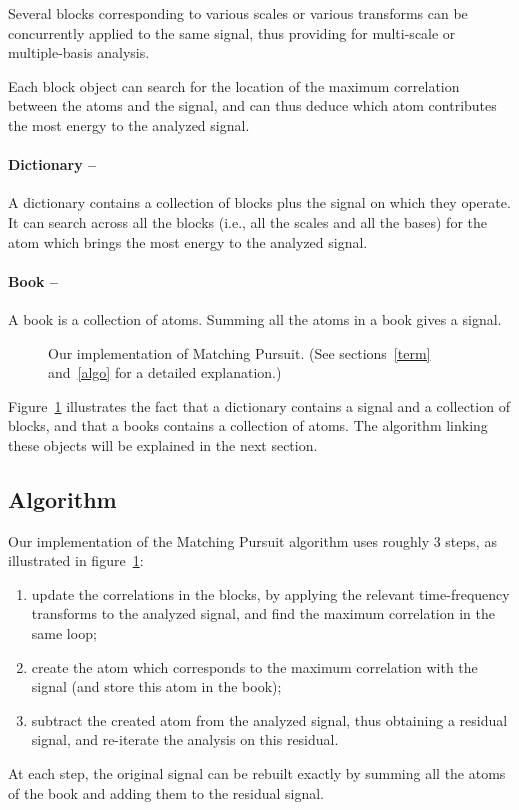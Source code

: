 \documentclass[11pt,a4paper]{article}
\begin{document}
Several blocks corresponding to various scales or various transforms can be
concurrently applied to the same signal, thus providing for multi-scale or
multiple-basis analysis.

Each block object can search for the location of the maximum correlation
between the atoms and the signal, and can thus deduce which atom contributes
the most energy to the analyzed signal.

\paragraph{Dictionary --} A dictionary contains a collection of blocks plus
the signal on which they operate. It can search across all the blocks (i.e.,
all the scales and all the bases) for the atom which brings the most energy to
the analyzed signal.

\paragraph{Book --} A book is a collection of atoms. Summing all the atoms in
a book gives a signal.

\bigskip

\begin{figure}[p]
\centerline{}
\caption{\label{mpcycle}Our implementation of Matching Pursuit. \newline
  (See sections~\ref{term} and~\ref{algo} for a detailed explanation.)}
\end{figure}
%
Figure~\ref{mpcycle} illustrates the fact that a dictionary contains a signal
and a collection of blocks, and that a books contains a collection of atoms.
The algorithm linking these objects will be explained in the next section.


\subsection{Algorithm \label{algo}}
Our implementation of the Matching Pursuit algorithm uses roughly 3 steps, as
illustrated in figure~\ref{mpcycle}:
\begin{enumerate}
\item update the correlations in the blocks, by applying the relevant
  time-frequency transforms to the analyzed signal, and find the maximum
  correlation in the same loop;
\item create the atom which corresponds to the maximum correlation with the
  signal (and store this atom in the book);
\item subtract the created atom from the analyzed signal, thus obtaining a
  residual signal, and re-iterate the analysis on this residual.
\end{enumerate}
At each step, the original signal can be rebuilt exactly by summing all the
atoms of the book and adding them to the residual signal.
\end{document}
